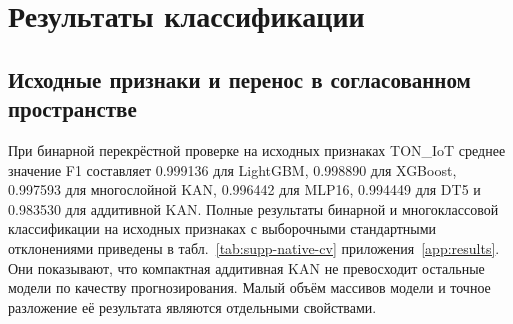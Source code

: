\section{Результаты классификации}
\subsection{Исходные признаки и перенос в согласованном пространстве}
При бинарной перекрёстной проверке на исходных признаках TON\_IoT среднее значение F1 составляет 0.999136 для LightGBM, 0.998890 для XGBoost, 0.997593 для многослойной KAN, 0.996442 для MLP16, 0.994449 для DT5 и 0.983530 для аддитивной KAN. Полные результаты бинарной и многоклассовой классификации на исходных признаках с выборочными стандартными отклонениями приведены в табл.~\ref{tab:supp-native-cv} приложения~\ref{app:results}. Они показывают, что компактная аддитивная KAN не превосходит остальные модели по качеству прогнозирования. Малый объём массивов модели и точное разложение её результата являются отдельными свойствами.



\begin{table}[t]
\caption{Средняя сбалансированная точность в расширенном согласованном пространстве. Первые два столбца обобщают по 50 обучений, остальные --- по 10. Обозначение Joint соответствует протоколу с равным вкладом двух доменов и отношением числа нормальных наблюдений к числу атак 1:5. Условия различаются составом и объёмом обучающей выборки.}
\label{tab:cross}
\centering\small
{}
\end{table}

